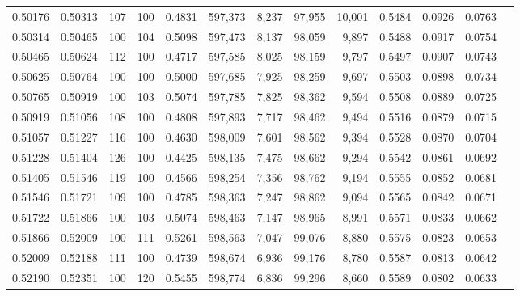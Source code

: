 \begin{tabular}{rrrrrrrrrrrrr}
0.50176 & 0.50313 &   107 & 100 &                                     0.4831 & 597,373 &   8,237 &  97,955 &  10,001 & 0.5484 & 0.0926 & 0.0763 \\
0.50314 & 0.50465 &   100 & 104 &                                     0.5098 & 597,473 &   8,137 &  98,059 &   9,897 & 0.5488 & 0.0917 & 0.0754 \\
0.50465 & 0.50624 &   112 & 100 &                                     0.4717 & 597,585 &   8,025 &  98,159 &   9,797 & 0.5497 & 0.0907 & 0.0743 \\
0.50625 & 0.50764 &   100 & 100 &                                     0.5000 & 597,685 &   7,925 &  98,259 &   9,697 & 0.5503 & 0.0898 & 0.0734 \\
0.50765 & 0.50919 &   100 & 103 &                                     0.5074 & 597,785 &   7,825 &  98,362 &   9,594 & 0.5508 & 0.0889 & 0.0725 \\
0.50919 & 0.51056 &   108 & 100 &                                     0.4808 & 597,893 &   7,717 &  98,462 &   9,494 & 0.5516 & 0.0879 & 0.0715 \\
0.51057 & 0.51227 &   116 & 100 &                                     0.4630 & 598,009 &   7,601 &  98,562 &   9,394 & 0.5528 & 0.0870 & 0.0704 \\
0.51228 & 0.51404 &   126 & 100 &                                     0.4425 & 598,135 &   7,475 &  98,662 &   9,294 & 0.5542 & 0.0861 & 0.0692 \\
0.51405 & 0.51546 &   119 & 100 &                                     0.4566 & 598,254 &   7,356 &  98,762 &   9,194 & 0.5555 & 0.0852 & 0.0681 \\
0.51546 & 0.51721 &   109 & 100 &                                     0.4785 & 598,363 &   7,247 &  98,862 &   9,094 & 0.5565 & 0.0842 & 0.0671 \\
0.51722 & 0.51866 &   100 & 103 &                                     0.5074 & 598,463 &   7,147 &  98,965 &   8,991 & 0.5571 & 0.0833 & 0.0662 \\
0.51866 & 0.52009 &   100 & 111 &                                     0.5261 & 598,563 &   7,047 &  99,076 &   8,880 & 0.5575 & 0.0823 & 0.0653 \\
0.52009 & 0.52188 &   111 & 100 &                                     0.4739 & 598,674 &   6,936 &  99,176 &   8,780 & 0.5587 & 0.0813 & 0.0642 \\
0.52190 & 0.52351 &   100 & 120 &                                     0.5455 & 598,774 &   6,836 &  99,296 &   8,660 & 0.5589 & 0.0802 & 0.0633 \\

\end{tabular}

